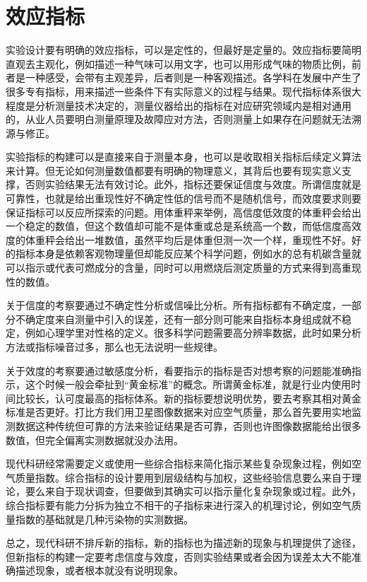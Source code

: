 \documentclass[]{tufte-book}
\begin{document}
\hypertarget{ux6548ux5e94ux6307ux6807}{%
\section{效应指标}\label{ux6548ux5e94ux6307ux6807}}

实验设计要有明确的效应指标，可以是定性的，但最好是定量的。效应指标要简明直观去主观化，例如描述一种气味可以用文字，也可以用形成气味的物质比例，前者是一种感受，会带有主观差异，后者则是一种客观描述。各学科在发展中产生了很多专有指标，用来描述一些条件下有实际意义的过程与结果。现代指标体系很大程度是分析测量技术决定的，测量仪器给出的指标在对应研究领域内是相对通用的，从业人员要明白测量原理及故障应对方法，否则测量上如果存在问题就无法溯源与修正。

实验指标的构建可以是直接来自于测量本身，也可以是收取相关指标后续定义算法来计算。但无论如何测量数值都要有明确的物理意义，其背后也要有现实意义支撑，否则实验结果无法有效讨论。此外，指标还要保证信度与效度。所谓信度就是可靠性，也就是给出重现性好不确定性低的信号而不是随机信号，而效度要求则要保证指标可以反应所探索的问题。用体重秤来举例，高信度低效度的体重秤会给出一个稳定的数值，但这个数值却可能不是体重或总是系统高一个数，而低信度高效度的体重秤会给出一堆数值，虽然平均后是体重但测一次一个样，重现性不好。好的指标本身是依赖客观物理量但却能反应某个科学问题，例如水的总有机碳含量就可以指示或代表可燃成分的含量，同时可以用燃烧后测定质量的方式来得到高重现性的数值。

关于信度的考察要通过不确定性分析或信噪比分析。所有指标都有不确定度，一部分不确定度来自测量中引入的误差，还有一部分则可能来自指标本身组成就不稳定，例如心理学里对性格的定义。很多科学问题需要高分辨率数据，此时如果分析方法或指标噪音过多，那么也无法说明一些规律。

关于效度的考察要通过敏感度分析，看要指示的指标是否对想考察的问题能准确指示，这个时候一般会牵扯到``黄金标准''的概念。所谓黄金标准，就是行业内使用时间比较长，认可度最高的指标体系。新的指标要想说明优势，要去考察其相对黄金标准是否更好。打比方我们用卫星图像数据来对应空气质量，那么首先要用实地监测数据这种传统但可靠的方法来验证结果是否可靠，否则也许图像数据能给出很多数值，但完全偏离实测数据就没办法用。

现代科研经常需要定义或使用一些综合指标来简化指示某些复杂现象过程，例如空气质量指数。综合指标的设计要用到层级结构与加权，这些经验信息要么来自于理论，要么来自于现状调查，但要做到其确实可以指示量化复杂现象或过程。此外，综合指标要有能力分拆为独立不相干的子指标来进行深入的机理讨论，例如空气质量指数的基础就是几种污染物的实测数据。

总之，现代科研不排斥新的指标，新的指标也为描述新的现象与机理提供了途径，但新指标的构建一定要考虑信度与效度，否则实验结果或者会因为误差太大不能准确描述现象，或者根本就没有说明现象。
\end{document}
